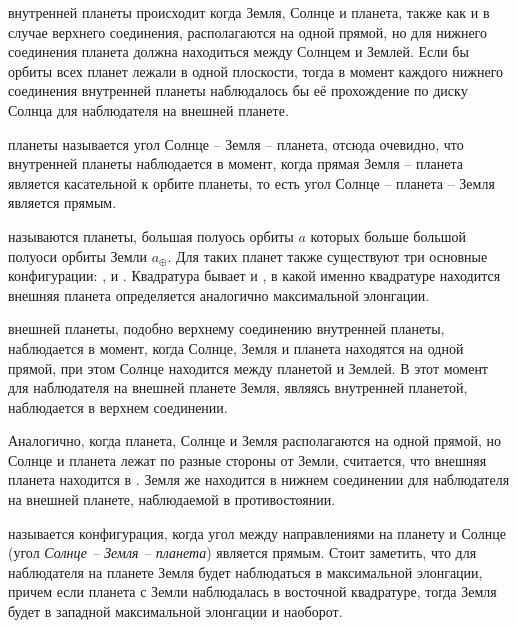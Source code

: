  внутренней планеты происходит когда Земля, Солнце и планета, также как и в случае верхнего соединения, располагаются на одной прямой, но для нижнего соединения планета должна находиться между Солнцем и Землей. Если бы орбиты всех планет лежали в одной плоскости, тогда в момент каждого нижнего соединения внутренней планеты наблюдалось бы её прохождение по диску Солнца для наблюдателя на внешней планете.




 планеты называется угол Солнце -- Земля -- планета, отсюда очевидно, что  внутренней планеты наблюдается в момент, когда прямая Земля -- планета является касательной к орбите планеты, то есть угол Солнце -- планета -- Земля является прямым.

 называются планеты, большая полуось орбиты $a$ которых больше большой полуоси орбиты Земли $a_\oplus$. Для таких планет также существуют три основные конфигурации: ,  и . Квадратура бывает  и , в какой именно квадратуре находится внешняя планета определяется аналогично максимальной элонгации.

 внешней планеты, подобно верхнему соединению внутренней планеты, наблюдается в момент, когда Солнце, Земля и планета находятся на одной прямой, при этом Солнце находится между планетой и Землей. В этот момент для наблюдателя на внешней планете Земля, являясь внутренней планетой, наблюдается в верхнем соединении.

Аналогично, когда планета, Солнце и Земля располагаются на одной прямой, но Солнце и планета лежат по разные стороны от Земли, считается, что внешняя планета находится в . Земля же находится в нижнем соединении для наблюдателя на внешней планете, наблюдаемой в противостоянии.

 называется конфигурация, когда угол между направлениями на планету и Солнце (угол {\slshape Солнце -- Земля -- планета}) является прямым. Стоит заметить, что для наблюдателя на планете Земля будет наблюдаться в максимальной элонгации, причем если планета с Земли наблюдалась в восточной квадратуре, тогда Земля будет в западной максимальной элонгации и наоборот.

